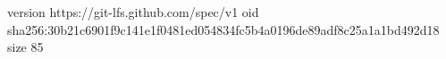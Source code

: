 version https://git-lfs.github.com/spec/v1
oid sha256:30b21c6901f9c141e1f0481ed054834fc5b4a0196de89adf8c25a1a1bd492d18
size 85
